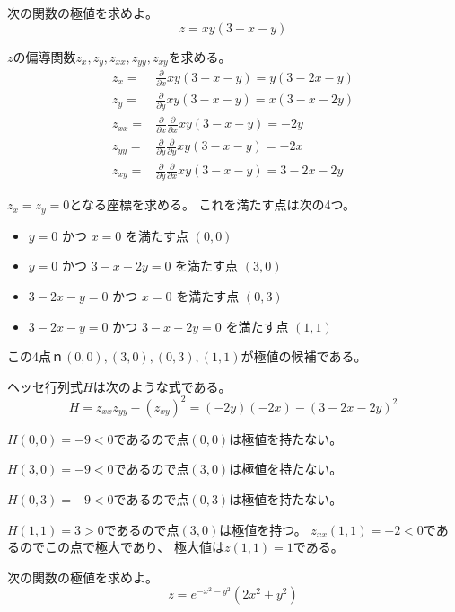 \documentclass[12pt,b5paper]{ltjsarticle}
\begin{document}
\newpage

\hrulefill


次の関数の極値を求めよ。
\begin{equation}
 z=xy(3-x-y)
\end{equation}

$z$の偏導関数$z_x,z_y,z_{xx},z_{yy},z_{xy}$を求める。
\begin{align}
 z_x =& \frac{\partial}{\partial x} xy(3-x-y) = y(3-2x -y)\\
 z_y =& \frac{\partial}{\partial y} xy(3-x-y) = x(3-x -2y)\\
 z_{xx} =& \frac{\partial}{\partial x} \frac{\partial}{\partial x} xy(3-x-y) = -2y\\
 z_{yy} =& \frac{\partial}{\partial y} \frac{\partial}{\partial y} xy(3-x-y) = -2x\\
 z_{xy} =& \frac{\partial}{\partial y} \frac{\partial}{\partial x} xy(3-x-y) = 3-2x -2y
\end{align}

$z_x=z_y=0$となる座標を求める。
これを満たす点は次の4つ。
\begin{itemize}
 \item $y=0$ かつ $x=0$ を満たす点 $(0,0)$
 \item $y=0$ かつ $3-x-2y=0$ を満たす点 $(3,0)$
 \item $3-2x-y=0$ かつ $x=0$ を満たす点 $(0,3)$
 \item $3-2x-y=0$ かつ $3-x-2y=0$ を満たす点 $(1,1)$
\end{itemize}

この4点ｎ$(0,0),(3,0),(0,3),(1,1)$が極値の候補である。

ヘッセ行列式$H$は次のような式である。
\begin{equation}
 H=z_{xx}z_{yy}-(z_{xy})^2=(-2y)(-2x)-(3-2x-2y)^2
\end{equation}

$H(0,0)=-9<0$であるので点$(0,0)$は極値を持たない。

$H(3,0)=-9<0$であるので点$(3,0)$は極値を持たない。

$H(0,3)=-9<0$であるので点$(0,3)$は極値を持たない。

$H(1,1)=3>0$であるので点$(3,0)$は極値を持つ。
$z_{xx}(1,1)=-2<0$であるのでこの点で極大であり、
極大値は$z(1,1)=1$である。



\hrulefill

\newpage

\hrulefill


次の関数の極値を求めよ。
\begin{equation}
 z=e^{-x^2-y^2}(2x^2+y^2)
\end{equation}
\end{document}
